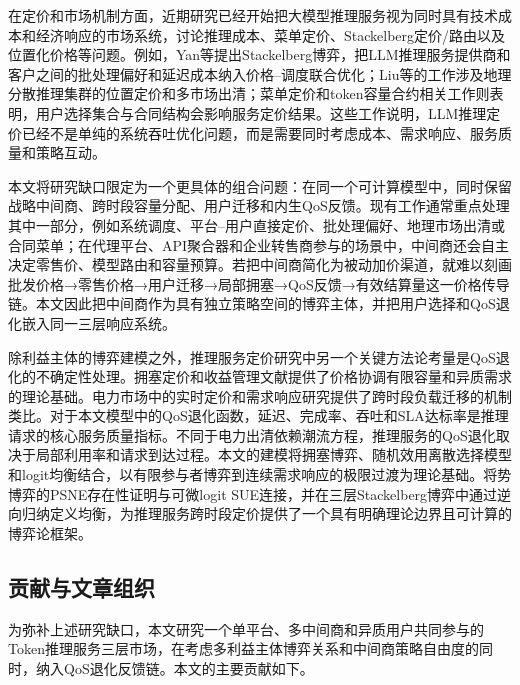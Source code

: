 \documentclass[UTF8,11pt]{ctexart}
\begin{document}
在定价和市场机制方面，近期研究已经开始把大模型推理服务视为同时具有技术成本和经济响应的市场系统，讨论推理成本、菜单定价、Stackelberg定价/路由以及位置化价格等问题\cite{demirer2025emerging,erdil2025inference,bergemann2025menu,guo2026prillm,yan2026stackelberg,liu2026locational}。例如，Yan等提出Stackelberg博弈，把LLM推理服务提供商和客户之间的批处理偏好和延迟成本纳入价格--调度联合优化；Liu等的工作涉及地理分散推理集群的位置定价和多市场出清；菜单定价和token容量合约相关工作则表明，用户选择集合与合同结构会影响服务定价结果\cite{bergemann2025menu,xing2026tokenfutures}。这些工作说明，LLM推理定价已经不是单纯的系统吞吐优化问题，而是需要同时考虑成本、需求响应、服务质量和策略互动。

本文将研究缺口限定为一个更具体的组合问题：在同一个可计算模型中，同时保留战略中间商、跨时段容量分配、用户迁移和内生QoS反馈。现有工作通常重点处理其中一部分，例如系统调度、平台--用户直接定价、批处理偏好、地理市场出清或合同菜单；在代理平台、API聚合器和企业转售商参与的场景中，中间商还会自主决定零售价、模型路由和容量预算。若把中间商简化为被动加价渠道，就难以刻画批发价格→零售价格→用户迁移→局部拥塞→QoS反馈→有效结算量这一价格传导链。本文因此把中间商作为具有独立策略空间的博弈主体，并把用户选择和QoS退化嵌入同一三层响应系统。

除利益主体的博弈建模之外，推理服务定价研究中另一个关键方法论考量是QoS退化的不确定性处理。拥塞定价和收益管理文献提供了价格协调有限容量和异质需求的理论基础\cite{vickrey1969congestion,gallego1994dynamic,elmaghraby2003dynamic,bitran2003overview,talluri2004revenue,phillips2005pricing}。电力市场中的实时定价和需求响应研究提供了跨时段负载迁移的机制类比\cite{schweppe1988spot,borenstein2005long,albadi2008summary,faruqui2010household,siano2014demand}。对于本文模型中的QoS退化函数，延迟、完成率、吞吐和SLA达标率是推理请求的核心服务质量指标。不同于电力出清依赖潮流方程，推理服务的QoS退化取决于局部利用率和请求到达过程。本文的建模将拥塞博弈、随机效用离散选择模型和logit均衡结合，以有限参与者博弈到连续需求响应的极限过渡为理论基础\cite{rosenthal1973class,monderer1996potential,wardrop1952some,sandholm2010population,mcfadden1974conditional,train2009discrete}。将势博弈的PSNE存在性证明与可微logit SUE连接，并在三层Stackelberg博弈中通过逆向归纳定义均衡，为推理服务跨时段定价提供了一个具有明确理论边界且可计算的博弈论框架。

\subsection{贡献与文章组织}

为弥补上述研究缺口，本文研究一个单平台、多中间商和异质用户共同参与的Token推理服务三层市场，在考虑多利益主体博弈关系和中间商策略自由度的同时，纳入QoS退化反馈链。本文的主要贡献如下。
\end{document}
